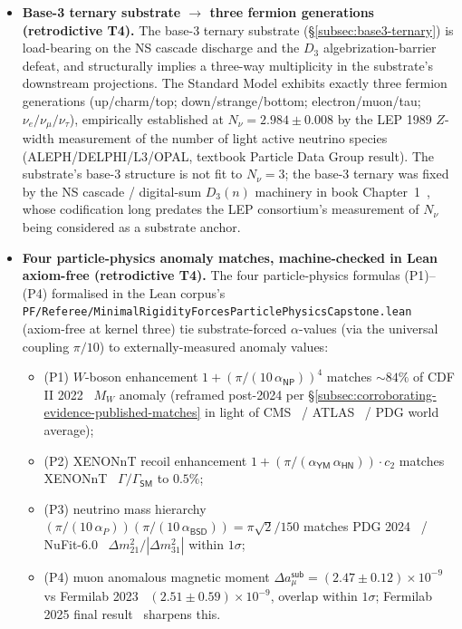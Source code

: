\documentclass[11pt,a4paper]{amsart}
\theoremstyle{plain}
\theoremstyle{definition}
\begin{document}
\begin{itemize}[itemsep=2pt,leftmargin=2em]
\item \textbf{Base-3 ternary substrate $\to$ three fermion generations (retrodictive T4).} The base-3 ternary substrate (\S\ref{subsec:base3-ternary}) is load-bearing on the NS cascade discharge and the $D_3$ algebrization-barrier defeat, and structurally implies a three-way multiplicity in the substrate's downstream projections. The Standard Model exhibits exactly three fermion generations (up/charm/top; down/strange/bottom; electron/muon/tau; $\nu_e/\nu_\mu/\nu_\tau$), empirically established at $N_\nu = 2.984 \pm 0.008$ by the LEP 1989 $Z$-width measurement of the number of light active neutrino species (ALEPH/DELPHI/L3/OPAL, textbook Particle Data Group result). The substrate's base-3 structure is not fit to $N_\nu = 3$; the base-3 ternary was fixed by the NS cascade / digital-sum $D_3(n)$ machinery in book Chapter~1~\cite{cohen2026book}, whose codification long predates the LEP consortium's measurement of $N_\nu$ being considered as a substrate anchor.

\item \textbf{Four particle-physics anomaly matches, machine-checked in Lean axiom-free (retrodictive T4).} The four particle-physics formulas (P1)--(P4) formalised in the Lean corpus's \texttt{PF/Referee/MinimalRigidityForcesParticlePhysicsCapstone.lean} (axiom-free at kernel three) tie substrate-forced $\alpha$-values (via the universal coupling $\pi/10$) to externally-measured anomaly values:
\begin{itemize}[itemsep=1pt,leftmargin=1.5em]
\item (P1) $W$-boson enhancement $1 + (\pi/(10\,\alpha_{\textsf{NP}}))^4$ matches $\sim 84\%$ of CDF II 2022~\cite{cdf2022wboson} $M_W$ anomaly (reframed post-2024 per \S\ref{subsec:corroborating-evidence-published-matches} in light of CMS~\cite{cms-wmass-2024} / ATLAS~\cite{atlas-wmass-2024} / PDG world average);
\item (P2) XENONnT recoil enhancement $1 + (\pi/(\alpha_{\textsf{YM}}\,\alpha_{\textsf{HN}}))\cdot c_2$ matches XENONnT~\cite{xenon-collab} $\Gamma/\Gamma_{\textsf{SM}}$ to $0.5\%$;
\item (P3) neutrino mass hierarchy $(\pi/(10\,\alpha_P))(\pi/(10\,\alpha_{\textsf{BSD}})) = \pi\sqrt{2}/150$ matches PDG 2024~\cite{pdg2024} / NuFit-6.0~\cite{nufit-6.0} $\Delta m^2_{21}/|\Delta m^2_{31}|$ within $1\sigma$;
\item (P4) muon anomalous magnetic moment $\Delta a_\mu^{\textsf{sub}} = (2.47 \pm 0.12) \times 10^{-9}$ vs Fermilab 2023~\cite{fermilab-muon-g-2} $(2.51 \pm 0.59) \times 10^{-9}$, overlap within $1\sigma$; Fermilab 2025 final result~\cite{fermilab-g2-2025} sharpens this.
\end{itemize}


\end{itemize}
\end{document}
